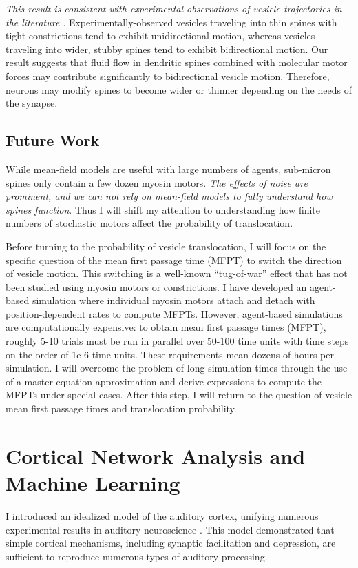 \documentclass[a4paper,11pt]{article}
\begin{document}
\textit{This result is consistent with experimental observations of vesicle trajectories in the literature \cite{park2020dynamics}}. Experimentally-observed vesicles traveling into thin spines with tight constrictions tend to exhibit unidirectional motion, whereas vesicles traveling into wider, stubby spines tend to exhibit bidirectional motion. Our result suggests that fluid flow in dendritic spines combined with molecular motor forces may contribute significantly to bidirectional vesicle motion. Therefore, neurons may modify spines to become wider or thinner depending on the needs of the synapse.

\subsection{Future Work}
While mean-field models are useful with large numbers of agents, sub-micron spines only contain a few dozen myosin motors. \textit{The effects of noise are prominent, and we can not rely on mean-field models to fully understand how spines function}. Thus I will shift my attention to understanding how finite numbers of stochastic motors affect the probability of translocation.

Before turning to the probability of vesicle translocation, I will focus on the specific question of the mean first passage time (MFPT) to switch the direction of vesicle motion. This switching is a well-known ``tug-of-war'' effect \cite{julicher1995cooperative} that has not been studied using myosin motors or constrictions. I have developed an agent-based simulation where individual myosin motors attach and detach with position-dependent rates to compute MFPTs. However, agent-based simulations are computationally expensive: to obtain mean first passage times (MFPT), roughly 5-10 trials must be run in parallel over 50-100 time units with time steps on the order of 1e-6 time units. These requirements mean dozens of hours per simulation. I will overcome the problem of long simulation times through the use of a master equation approximation and derive expressions to compute the MFPTs under special cases. After this step, I will return to the question of vesicle mean first passage times and translocation probability.


\section{Cortical Network Analysis and Machine Learning}\label{sec:data}

I introduced an idealized model of the auditory cortex, unifying numerous experimental results in auditory neuroscience \cite{park2020circuit}. This model demonstrated that simple cortical mechanisms, including synaptic facilitation and depression, are sufficient to reproduce numerous types of auditory processing.
\end{document}
